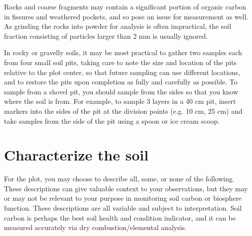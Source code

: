 \documentclass[11pt,letterpaper,oneside,onecolumn]{memoir}
\begin{document}
Rocks and coarse fragments may contain a significant portion of organic carbon in fissures and weathered pockets, and so pose an issue for measurement as well. As grinding the rocks into powder for analysis is often impractical, the soil fraction consisting of particles larger than 2 mm is usually ignored.

In rocky or gravelly soils, it may be most practical to gather two samples each from four small soil pits, taking care to note the size and location of the pits relative to the plot center, so that future sampling can use different locations, and to restore the pits upon completion as fully and carefully as possible. To sample from a shovel pit, you should sample from the sides so that you know where the soil is from. For example, to sample 3 layers in a 40 cm pit, insert markers into the sides of the pit at the division points (e.g. 10 cm, 25 cm) and take samples from the side of the pit using a spoon or ice cream scoop.

\section{Characterize the soil}

For the plot, you may choose to describe all, some, or none of the following. These descriptions can give valuable context to your observations, but they may or may not be relevant to your purpose in monitoring soil carbon or biosphere function. These descriptions are all variable and subject to interpretation. Soil carbon is perhaps the best soil health and condition indicator, and it can be measured accurately via dry combustion/elemental analysis.
\end{document}
